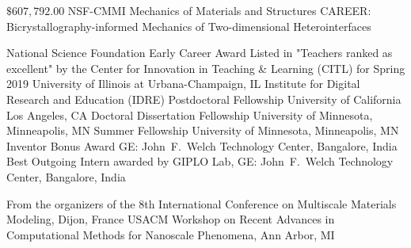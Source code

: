 \documentclass[numbers]{cv}
\begin{document}
\begin{researchinterests}
\end{researchinterests}


\begin{externalfunding}
           {$\$607,792.00$}
           {NSF-CMMI}
           {Mechanics of Materials and Structures}
           {CAREER: Bicrystallography-informed Mechanics of Two-dimensional Heterointerfaces}
           {}
\end{externalfunding}




\begin{honors}
  {National Science Foundation Early Career Award}
  {Listed in "Teachers ranked as excellent" by the Center for Innovation in
  Teaching \& Learning (CITL) for Spring 2019}
  {University of Illinois at Urbana-Champaign, IL}
  {Institute for Digital Research and Education (IDRE) Postdoctoral Fellowship }
  {University of California Los Angeles, CA}
  {Doctoral Dissertation Fellowship}
  {University of Minnesota, Minneapolis, MN}
  {Summer Fellowship}
  {University of Minnesota, Minneapolis, MN}
  {Inventor Bonus Award}
  {GE: John~F.~Welch Technology Center, Bangalore, India}
  {Best Outgoing Intern}
  {awarded by GIPLO Lab, GE: John~F.~Welch Technology Center, Bangalore, India}
%
\end{honors}

\begin{travelgrant}
    {From the organizers of the 8th International Conference on Multiscale Materials Modeling, Dijon, France}
    {}
    {USACM Workshop on Recent Advances in Computational Methods for Nanoscale
    Phenomena, Ann Arbor, MI}
    {}
\end{travelgrant}
\end{document}
